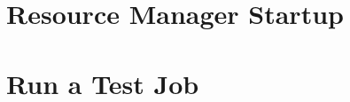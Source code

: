 \documentclass[letterpaper]{article}
\begin{document}



\vspace*{0.2cm}

\section{Resource Manager Startup} \label{sec:rms_startup}


\section{Run a Test Job} \label{sec:test_job}


%
\end{document}
